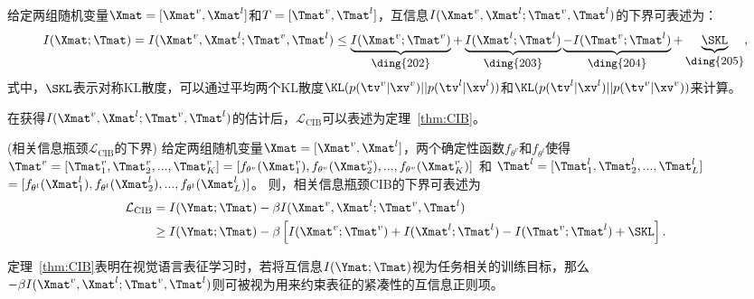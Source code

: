 \begin{theorem}
\label{thm:JMI}
给定两组随机变量$\Xmat=[\Xmat^v, \Xmat^l]$和$T=[\Tmat^v, \Tmat^l]$，互信息$I(\Xmat^v, \Xmat^l; \Tmat^v, \Tmat^l)$的下界可表述为：
\begin{equation}
\begin{aligned}
I(\Xmat; \Tmat) = I(\Xmat^v, \Xmat^l; \Tmat^v, \Tmat^l) \le \underbrace{I(\Xmat^v; \Tmat^v)}_{\text{\small{\ding{202}}}} + \underbrace{I(\Xmat^l; \Tmat^l)}_{\text{\small{\ding{203}}}} \underbrace{- I(\Tmat^v; \Tmat^l)}_{\text{\small{\ding{204}}}} + \underbrace{\SKL}_{\text{\small{\ding{205}}}}, 
\end{aligned}
\label{eq:c4_JMI}
\end{equation}
式中，$\SKL$表示对称KL散度，可以通过平均两个KL散度$\KL(p(\tv^v|\xv^v)||p(\tv^l|\xv^l))$和$\KL(p(\tv^l|\xv^l)||p(\tv^v|\xv^v))$来计算。
\end{theorem}

在获得$I(\Xmat^v, \Xmat^l; \Tmat^v, \Tmat^l)$的估计后，$\mathcal{L}_{\text{CIB}}$可以表述为定理~\ref{thm:CIB}。

\begin{theorem}(相关信息瓶颈$\mathcal{L}_{\text{CIB}}$的下界) 
给定两组随机变量$\Xmat = [\Xmat^v, \Xmat^l]$，两个确定性函数$f_{\theta^v}$和$f_{\theta^l}$使得$\Tmat^v = [\Tmat^v_{1}, \Tmat^v_{2}, ..., \Tmat^v_{K}] = [f_{\theta^v}(\Xmat^v_{1}), f_{\theta^v}(\Xmat^v_{2}), ..., f_{\theta^v}(\Xmat^v_{K})]$ 和 $\Tmat^l = [\Tmat^l_{1}, \Tmat^l_{2}, ..., \Tmat^l_{L}]$ $= [f_{\theta^l}(\Xmat^l_{1}), f_{\theta^l}(\Xmat^l_{2}), ..., f_{\theta^l}(\Xmat^l_{L})]$。
则，相关信息瓶颈CIB的下界可表述为
\begin{equation} 
\begin{aligned}
\mathcal{L}_{\text{CIB}} &= I(\Ymat; \Tmat) - \beta I(\Xmat^v, \Xmat^l; \Tmat^v, \Tmat^l)\\ 
&\ge I(\Ymat; \Tmat) - \beta\left[I(\Xmat^v; \Tmat^v) + I(\Xmat^l; \Tmat^l) - I(\Tmat^v; \Tmat^l) + \SKL \right]. 
\end{aligned}
\label{eq:CIB_all}
\end{equation} 
\label{thm:CIB}
\end{theorem} 

定理~\ref{thm:CIB}表明在视觉语言表征学习时，若将互信息$I(\Ymat; \Tmat)$视为任务相关的训练目标，那么$-\beta I(\Xmat^v, \Xmat^l; \Tmat^v, \Tmat^l)$则可被视为用来约束表征的紧凑性的互信息正则项。



